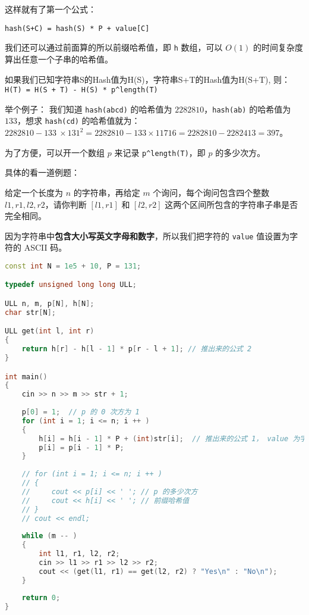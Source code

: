 这样就有了第一个公式：

\verb`hash(S+C) = hash(S) * P + value[C]`

我们还可以通过前面算的所以前缀哈希值，即 \verb`h` 数组，可以 $O(1)$ 的时间复杂度算出任意一个子串的哈希值。

如果我们已知字符串S的Hash值为H(S)，字符串S+T的Hash值为H(S+T),
则：\verb`H(T) = H(S + T) - H(S) * p^length(T)`

举个例子：
我们知道 \verb`hash(abcd)` 的哈希值为 $2282810$，\verb`hash(ab)` 的哈希值为 $133$，想求 \verb`hash(cd)` 的哈希值就为：
$2282810 - 133\  \times 131^2 = 2282810 - 133 \times 11716 = 2282810 - 2282413 = 397$。

为了方便，可以开一个数组 $p$ 来记录 \verb`p^length(T)`，即 $p$ 的多少次方。

具体的看一道例题：

给定一个长度为 $n$ 的字符串，再给定 $m$ 个询问，每个询问包含四个整数 $l1,r1,l2,r2$，请你判断 $[l1,r1]$ 和 $[l2,r2]$ 这两个区间所包含的字符串子串是否完全相同。

因为字符串中\textbf{包含大小写英文字母和数字}，所以我们把字符的 \verb`value` 值设置为字符的 ASCII 码。

\begin{lstlisting}[language=cpp]
const int N = 1e5 + 10, P = 131;

typedef unsigned long long ULL;

ULL n, m, p[N], h[N];
char str[N];

ULL get(int l, int r)
{
    return h[r] - h[l - 1] * p[r - l + 1]; // 推出来的公式 2
}

int main()
{
    cin >> n >> m >> str + 1;
    
    p[0] = 1;  // p 的 0 次方为 1
    for (int i = 1; i <= n; i ++ )
    {
        h[i] = h[i - 1] * P + (int)str[i];  // 推出来的公式 1， value 为字符的 ASCII
        p[i] = p[i - 1] * P;
    }
    
    // for (int i = 1; i <= n; i ++ )
    // {
    //     cout << p[i] << ' '; // p 的多少次方
    //     cout << h[i] << ' '; // 前缀哈希值
    // }
    // cout << endl;
    
    while (m -- )
    {
        int l1, r1, l2, r2;
        cin >> l1 >> r1 >> l2 >> r2;
        cout << (get(l1, r1) == get(l2, r2) ? "Yes\n" : "No\n");
    }
    
    return 0;
}
\end{lstlisting}

